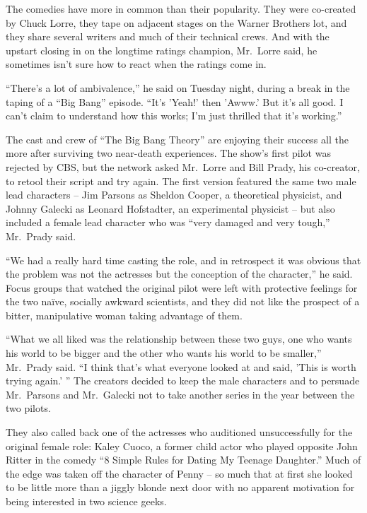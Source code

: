 ﻿\documentclass[12pt]{article}
\begin{document}
The comedies have more in common than their popularity. They were co-created by Chuck Lorre, they
tape on adjacent stages on the Warner Brothers lot, and they share several writers and much of their
technical crews. And with the upstart closing in on the longtime ratings champion, Mr.~Lorre said,
he sometimes isn't sure how to react when the ratings come in.

``There's a lot of ambivalence\cite{ambivalence},'' he said on Tuesday night, during a break in the
taping of a ``Big Bang'' episode. ``It's 'Yeah!' then 'Awww.' But it's all good. I can't claim to
understand how this works; I'm just thrilled that it's working.''

The cast and crew of ``The Big Bang Theory'' are enjoying their success all the more after surviving
two near-death experiences. The show's first pilot was rejected by CBS, but the network asked
Mr.~Lorre and Bill Prady, his co-creator, to retool their script and try again. The first version
featured the same two male lead characters -- Jim Parsons as Sheldon Cooper, a theoretical
physicist, and Johnny Galecki as Leonard Hofstadter, an experimental physicist -- but also included
a female lead character who was ``very damaged and very tough,'' Mr.~Prady said.

``We had a really hard time casting the role, and in retrospect it was obvious that the problem was
not the actresses but the conception of the character,'' he said. Focus groups that watched the
original pilot were left with protective feelings for the two na\"ive, socially awkward scientists,
and they did not like the prospect of a bitter, manipulative woman taking advantage of them.

``What we all liked was the relationship between these two guys, one who wants his world to be
bigger and the other who wants his world to be smaller,'' Mr.~Prady said. ``I think that's what
everyone looked at and said, 'This is worth trying again.' '' The creators decided to keep the male
characters and to persuade Mr.~Parsons and Mr.~Galecki not to take another series in the year
between the two pilots.

They also called back one of the actresses who auditioned unsuccessfully for the original female
role: Kaley Cuoco, a former child actor who played opposite John Ritter in the comedy ``8 Simple
Rules for Dating My Teenage Daughter.'' Much of the edge was taken off the character of Penny -- so
much that at first she looked to be little more than a jiggly blonde next door with no apparent
motivation for being interested in two science geeks.
\end{document}
